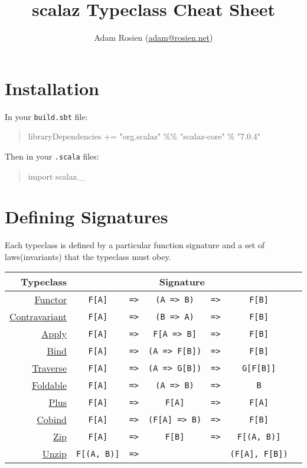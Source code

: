 \documentclass{tufte-handout}
\title{scalaz Typeclass Cheat Sheet}
\author[Adam Rosien]{Adam Rosien (\href{mailto:adam@rosien.net}{adam@rosien.net})}
\newcommand{\fa}{F[A]}
\newcommand{\fb}{F[B]}
\newcommand{\rarr}{\texttt{=>}}
\newcommand{\fTwo}[2]{\texttt{#1} & \rarr & & & \texttt{#2}}
\newcommand{\fThree}[3]{\texttt{#1} & \rarr & \texttt{#2} & \rarr & \texttt{#3}}
\newcommand{\sdocUrl}[1]{http://docs.typelevel.org/api/scalaz/stable/7.0.4/doc/\#scalaz.#1}
\newcommand{\sdocHref}[1]{\href{\sdocUrl{#1}}{#1}}
\begin{document}
\maketitle%

\section{Installation}\label{sec:installation}

\noindent In your \texttt{build.sbt} file:

\begin{quote}
  \ttfamily libraryDependencies += "org.scalaz" \%\% "scalaz-core" \% "7.0.4"
\end{quote}

\noindent Then in your \texttt{.scala} files:

\begin{quote}
  \ttfamily import scalaz.\_
\end{quote}

\section{Defining Signatures}

Each typeclass is defined by a particular function signature and a set of laws\footnotemark[1] (invariants) that the typeclass must obey.


\begin{table}[ht]
  \centering
  \selectfont
  \setlength{\tabcolsep}{5pt}
  \begin{tabular}{rcrcccl}
    Typeclass & \multicolumn{5}{c}{Signature} \\
    \midrule
    \sdocHref{Functor}               & \fThree{\fa}{(A => B)}{\fb} \\
    \sdocHref{Contravariant}         & \fThree{\fa}{(B => A)}{\fb} \\
    \sdocHref{Apply}\footnotemark[2] & \fThree{\fa}{F[A => B]}{\fb} \\
    \sdocHref{Bind}                  & \fThree{\fa}{(A => F[B])}{\fb} \\
    \sdocHref{Traverse}              & \fThree{\fa}{(A => G[B])}{G[F[B]]} \\
    \sdocHref{Foldable}              & \fThree{\fa}{(A => B)}{B} \\
    \sdocHref{Plus}                  & \fThree{\fa}{\fa}{\fa} \\
    \sdocHref{Cobind}                & \fThree{\fa}{(F[A] => B)}{\fb} \\
    \sdocHref{Zip}                   & \fThree{\fa}{\fb}{F[(A, B)]} \\
    \sdocHref{Unzip}                 & \fTwo{F[(A, B)]}{(F[A], F[B])} \\
  \end{tabular}
  \label{tab:normaltab}
\end{table}
\end{document}
